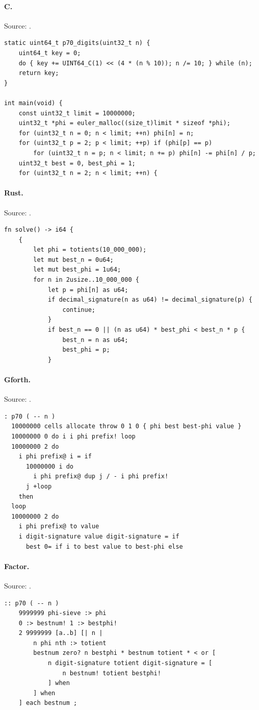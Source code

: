 \paragraph{C.} Source: .
\begin{lstlisting}
static uint64_t p70_digits(uint32_t n) {
    uint64_t key = 0;
    do { key += UINT64_C(1) << (4 * (n % 10)); n /= 10; } while (n);
    return key;
}

int main(void) {
    const uint32_t limit = 10000000;
    uint32_t *phi = euler_malloc((size_t)limit * sizeof *phi);
    for (uint32_t n = 0; n < limit; ++n) phi[n] = n;
    for (uint32_t p = 2; p < limit; ++p) if (phi[p] == p)
        for (uint32_t n = p; n < limit; n += p) phi[n] -= phi[n] / p;
    uint32_t best = 0, best_phi = 1;
    for (uint32_t n = 2; n < limit; ++n) {
\end{lstlisting}

\paragraph{Rust.} Source: .
\begin{lstlisting}
fn solve() -> i64 {
    {
        let phi = totients(10_000_000);
        let mut best_n = 0u64;
        let mut best_phi = 1u64;
        for n in 2usize..10_000_000 {
            let p = phi[n] as u64;
            if decimal_signature(n as u64) != decimal_signature(p) {
                continue;
            }
            if best_n == 0 || (n as u64) * best_phi < best_n * p {
                best_n = n as u64;
                best_phi = p;
            }
\end{lstlisting}

\paragraph{Gforth.} Source: .
\begin{lstlisting}
: p70 ( -- n )
  10000000 cells allocate throw 0 1 0 { phi best best-phi value }
  10000000 0 do i i phi prefix! loop
  10000000 2 do
    i phi prefix@ i = if
      10000000 i do
        i phi prefix@ dup j / - i phi prefix!
      j +loop
    then
  loop
  10000000 2 do
    i phi prefix@ to value
    i digit-signature value digit-signature = if
      best 0= if i to best value to best-phi else
\end{lstlisting}

\paragraph{Factor.} Source: .
\begin{lstlisting}
:: p70 ( -- n )
    9999999 phi-sieve :> phi
    0 :> bestnum! 1 :> bestphi!
    2 9999999 [a..b] [| n |
        n phi nth :> totient
        bestnum zero? n bestphi * bestnum totient * < or [
            n digit-signature totient digit-signature = [
                n bestnum! totient bestphi!
            ] when
        ] when
    ] each bestnum ;
\end{lstlisting}

